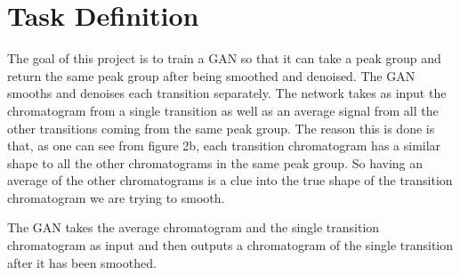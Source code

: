 \documentclass[12pt]{article}
\begin{document}
\section{Task Definition}
The goal of this project is to train a GAN so that it can take a peak group and return the same peak group after being smoothed and denoised.  
The GAN smooths and denoises each transition separately. The network takes as input the chromatogram from a single transition as well as an average signal from all the other transitions coming from the same peak group.  The reason this is done is that, as one can see from figure 2b, each transition chromatogram has a similar shape to all the other chromatograms in the same peak group. So having an average of the other chromatograms is a clue into the true shape of the transition chromatogram we are trying to smooth. 

The GAN takes the average chromatogram and the single transition chromatogram as input and then outputs a chromatogram of the single transition after it has been smoothed. 
\end{document}
